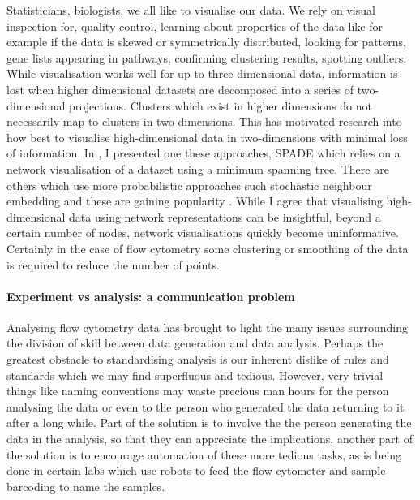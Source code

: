 Statisticians, biologists, we all like to visualise our data.
We rely on visual inspection for, quality control, learning about properties of the data like for example if the data is skewed or symmetrically distributed, looking for patterns, gene lists appearing in pathways, confirming clustering results, spotting outliers.
While visualisation works well for up to three dimensional data, information is lost when higher dimensional datasets are decomposed into a series of two-dimensional projections.
Clusters which exist in higher dimensions do not necessarily map to clusters in two dimensions.
This has motivated research into how best to visualise high-dimensional data in two-dimensions with minimal loss of information.
In , I presented one these approaches, \gls{SPADE} which relies on a network visualisation of a dataset using a minimum spanning tree.
There are others which use more probabilistic approaches such stochastic neighbour embedding and these are gaining popularity \citep{Amir:2013jp}.
While I agree that visualising high-dimensional data using network representations can be insightful, beyond a certain number of nodes, network visualisations quickly become uninformative.
Certainly in the case of flow cytometry some clustering or smoothing of the data is required to reduce the number of points.  



\paragraph{Experiment vs analysis: a communication problem}

Analysing flow cytometry data has brought to light the many issues surrounding the division of skill between data generation and data analysis.
Perhaps the greatest obstacle to standardising analysis is our inherent dislike of rules and standards which we may find superfluous and tedious.
However, very trivial things like naming conventions may waste precious man hours for the person analysing the data or even to the person who generated the data returning to it after a long while.
Part of the solution is to involve the the person generating the data in the analysis, so that they can appreciate the implications, another part of the solution is to encourage automation of these more tedious tasks, as is being done in certain labs which use robots to feed the flow cytometer and sample barcoding to name the samples.

